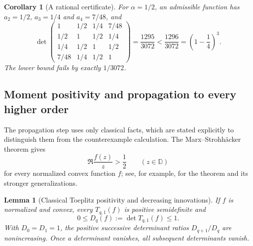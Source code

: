 \documentclass[11pt,a4paper]{article}
\numberwithin{equation}{section}
\newtheorem{lemma}[theorem]{Lemma}
\newtheorem{corollary}[theorem]{Corollary}
\theoremstyle{definition}\newtheorem{definition}[theorem]{Definition}
\theoremstyle{remark}\newtheorem{remark}[theorem]{Remark}
\begin{document}
\begin{corollary}[A rational certificate]
\label{cor:kls-rational}
For $\alpha=1/2$, an admissible function has
$a_2=1/2$, $a_3=1/4$ and $a_4=7/48$, and
\[
 \det\begin{pmatrix}
 1&1/2&1/4&7/48\\
 1/2&1&1/2&1/4\\
 1/4&1/2&1&1/2\\
 7/48&1/4&1/2&1
 \end{pmatrix}
 =\frac{1295}{3072}
 <\frac{1296}{3072}=\left(1-\frac14\right)^3.
\]
The lower bound fails by exactly $1/3072$.
\end{corollary}

\subsection{Moment positivity and propagation to every higher order}

The propagation step uses only classical facts, which are stated
explicitly to distinguish them from the counterexample calculation.
The Marx--Strohh\"acker theorem gives
\begin{equation}
 \Re\frac{f(z)}z>\frac12\qquad(z\in\mathbb D)
 \label{eq:kls-MS}
\end{equation}
for every normalized convex function $f$; see, for example,
\cite{SugawaWang2015} for the theorem and its stronger generalizations.

\begin{lemma}[Classical Toeplitz positivity and decreasing innovations]
\label{lem:kls-moment}
If $f$ is normalized and convex, every $T_{q,1}(f)$ is positive
semidefinite and
\[
 0\leq D_q(f):=\det T_{q,1}(f)\leq1.
\]
With $D_0=D_1=1$, the positive successive determinant ratios
$D_{q+1}/D_q$ are nonincreasing.  Once a determinant vanishes, all
subsequent determinants vanish.
\end{lemma}
\end{document}
